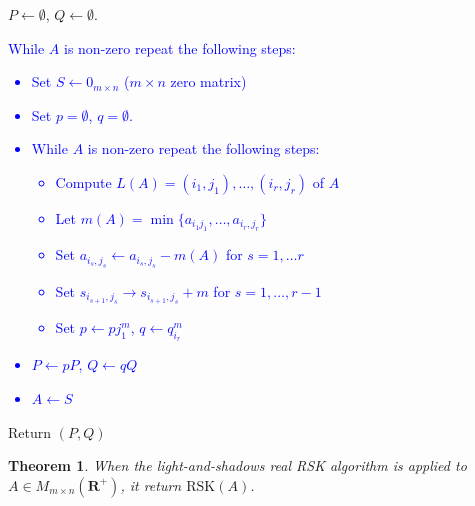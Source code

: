 \documentclass[10pt]{amsproc}
\newtheorem{theorem}{Theorem}[subsection]
\theoremstyle{definition}
\theoremstyle{remark}
\newcommand{\rp}{\mathbf{R}^+}
\newcommand{\rsk}{\mathrm{RSK}}
\newcommand{\ot}{\leftarrow}
\begin{document}
\begin{itemize}
\item $P\ot \emptyset$, $Q\ot\emptyset$.
  \textcolor{blue}{
  \item While $A$ is non-zero repeat the following steps:
    \begin{itemize}
    \item Set $S\ot 0_{m\times n}$ ($m\times n$ zero matrix)
    \item Set $p=\emptyset$, $q=\emptyset$.
    \item While $A$ is non-zero repeat the following steps:
      \begin{itemize}
      \item Compute $L(A) = (i_1,j_1),\dotsc,(i_r,j_r)$ of $A$
      \item Let $m(A)=\min\{a_{i_1j_1},\dotsc,a_{i_r,j_r}\}$
      \item Set $a_{i_s,j_s}\ot a_{i_s,j_s}-m(A)$ for $s=1,\dotsc r$
      \item Set $s_{i_{s+1},j_s}\to s_{i_{s+1},j_s}+m$ for $s=1,\dotsc,r-1$
      \item Set $p\ot pj_1^m$, $q\ot q_{i_r}^m$
      \end{itemize}
    \item $P\ot pP$, $Q\ot qQ$
    \item $A\ot S$
    \end{itemize}
  }
\item Return $(P, Q)$
\end{itemize}
\begin{theorem}
  When the light-and-shadows real RSK algorithm is applied to $A\in M_{m\times n}(\rp)$, it return $\rsk(A)$.
\end{theorem}
\end{document}
